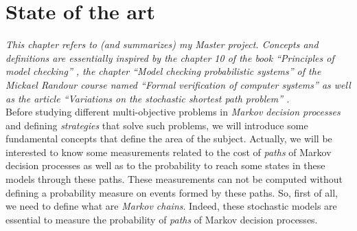 \chapter{State of the art}
\textit{This chapter refers to (and summarizes) my Master project. Concepts and definitions are essentially inspired by the chapter 10 of the book ``Principles of model checking'' \cite{PMC}, the chapter ``Model checking probabilistic systems'' of the Mickael Randour course named ``Formal verification of computer systems'' \cite{MRV} as well as the article ``Variations on the stochastic shortest path problem'' \cite{DBLP:journals/corr/RandourRS14a}.} \\

Before studying different multi-objective problems in \textit{Markov decision
processes} and defining \textit{strategies} that solve such problems, we will introduce some fundamental concepts that define the area of the subject.
Actually, we will be interested to know some measurements related to the cost of \textit{paths} of Markov decision processes as well as to the probability to reach some states in these models through these paths.
These measurements can not be computed without defining a probability measure on events formed by these paths.
So, first of all, we need to define what are \textit{Markov chains}. Indeed, these
stochastic models are essential to measure the probability of \textit{paths} of Markov decision processes.

